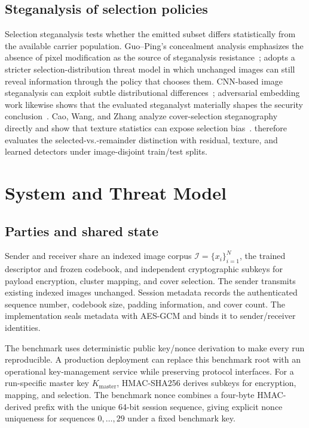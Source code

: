 \subsection{Steganalysis of selection policies}
Selection steganalysis tests whether the emitted subset differs statistically from the available carrier population. Guo--Ping's concealment analysis emphasizes the absence of pixel modification as the source of steganalysis resistance~\cite{guo2026capacity}; \method adopts a stricter selection-distribution threat model in which unchanged images can still reveal information through the policy that chooses them. CNN-based image steganalysis can exploit subtle distributional differences~\cite{li2023siamese}; adversarial embedding work likewise shows that the evaluated steganalyst materially shapes the security conclusion~\cite{wang2024adversarial}. Cao, Wang, and Zhang analyze cover-selection steganography directly and show that texture statistics can expose selection bias~\cite{cao2025selection}. \method therefore evaluates the selected-vs.-remainder distinction with residual, texture, and learned detectors under image-disjoint train/test splits.

\section{System and Threat Model}
\subsection{Parties and shared state}
Sender and receiver share an indexed image corpus $\mathcal{I}=\{x_i\}_{i=1}^{N}$, the trained descriptor and frozen codebook, and independent cryptographic subkeys for payload encryption, cluster mapping, and cover selection. The sender transmits existing indexed images unchanged. Session metadata records the authenticated sequence number, codebook size, padding information, and cover count. The implementation seals metadata with AES-GCM and binds it to sender/receiver identities.

The benchmark uses deterministic public key/nonce derivation to make every run reproducible. A production deployment can replace this benchmark root with an operational key-management service while preserving protocol interfaces. For a run-specific master key $K_{\mathrm{master}}$, HMAC-SHA256 derives subkeys for encryption, mapping, and selection. The benchmark nonce combines a four-byte HMAC-derived prefix with the unique 64-bit session sequence, giving explicit nonce uniqueness for sequences $0,\ldots,29$ under a fixed benchmark key.

